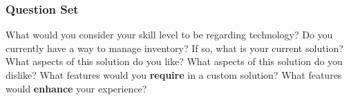 \documentclass[../../../main.tex]{subfiles}
\begin{document}
\subsubsection{Question Set}
\begin{outline}
  \1 What would you consider your skill level to be regarding technology?
  \1 Do you currently have a way to manage inventory?
  \1 If so, what is your current solution?
  \1 What aspects of this solution do you like?
  \1 What aspects of this solution do you dislike?
  \1 What features would you \textbf{require} in a custom solution?
  \1 What features would \textbf{enhance} your experience?
\end{outline}

\begin{comment}
CF
CF "SLT": library

what is the current system?
borrowing cards and date stamps that are manually written in for when books are due back
borrower card for who borrowed which book, stickers placed on books for categories

problems with existing solution
time consuming; cards get lost; stickers fall off
not very quick to see who borrowed what; have to look through all cards


like about the existing solution
primary aged students/children can do it (themselves)

requirements for new solution

scan a barcode / borrower ticket and instantly see what they've borrowed.

cost effective
compatible with existing hardware/software
works on ipa
ability to renew
notified when books are overdue
statistics (book numbers) by genre/author/category

enhancements for new solution
colored stickers for categories
ability to charge parents (make an invoice?)

is there a specific way you would like the system to be organised?
yes, we are a library so by preset genres and categories

do you have any questions of your own?
what's the timeframe for this being completed - March.

fake pupil: Ella (no surname)
year 6 "head librarian" age 10-**11** (y6)

problems with the current system
"so old fashioned, should be able to scan using my iPad! Then it could be pupil-led."

benefits
can see who borrowed the book I want and nag them to return it so I can read it!
when I forget which book I've borrowed the teacher can easily find which books I've lost

requirements
iPads; fast (can be done in break times - borrow/renew)




fake teacher
equipment for science lab/art room/ etc


can say helping a junior school.


\end{comment}
\end{document}
